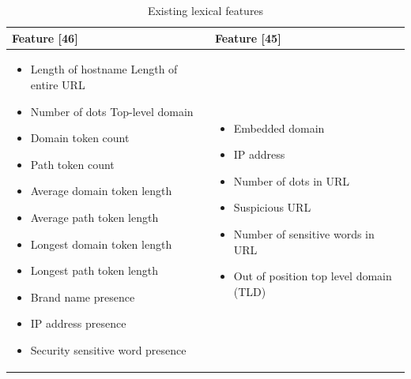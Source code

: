 \begin{table}
\begin{tabular}{>{\raggedright}p{5cm}>{\raggedright}p{4cm}}
\toprule 
\textbf{\footnotesize{}Feature {[}46{]}} & \textbf{\footnotesize{}Feature {[}45{]}}\tabularnewline
\midrule
\midrule 
\begin{itemize}
\item {\scriptsize{}Length of hostname Length of entire URL}{\scriptsize \par}
\item {\scriptsize{}Number of dots Top-level domain}{\scriptsize \par}
\item {\scriptsize{}Domain token count}{\scriptsize \par}
\item {\scriptsize{}Path token count}{\scriptsize \par}
\item {\scriptsize{}Average domain token length}{\scriptsize \par}
\item {\scriptsize{}Average path token length}{\scriptsize \par}
\item {\scriptsize{}Longest domain token length}{\scriptsize \par}
\item {\scriptsize{}Longest path token length}{\scriptsize \par}
\item {\scriptsize{}Brand name presence }{\scriptsize \par}
\item {\scriptsize{}IP address presence}{\scriptsize \par}
\item {\scriptsize{}Security sensitive word presence }\end{itemize}
 & \begin{itemize}
\item {\scriptsize{}Embedded domain}{\scriptsize \par}
\item {\scriptsize{}IP address}{\scriptsize \par}
\item {\scriptsize{}Number of dots in URL}{\scriptsize \par}
\item {\scriptsize{}Suspicious URL }{\scriptsize \par}
\item {\scriptsize{}Number of sensitive words in URL}{\scriptsize \par}
\item {\scriptsize{}Out of position top level domain (TLD) }\end{itemize}
\tabularnewline
\bottomrule
\end{tabular}\protect\caption{\label{tab:exist-lex}Existing lexical features}
\end{table}




